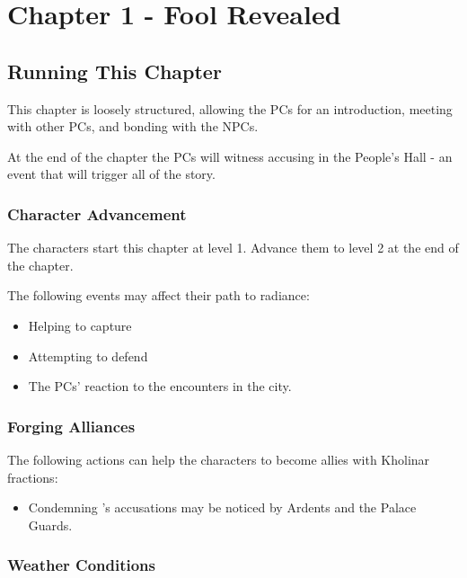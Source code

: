\chapter{Chapter 1 - Fool Revealed}
\label{chap:chapter1}

\setcounter{section}{-1}
\section{Running This Chapter}

This chapter is loosely structured, allowing the PCs for an introduction, meeting with other PCs, and bonding with the NPCs.

At the end of the chapter the PCs will witness \npcRebelArdent{} accusing \npcQueen{} in the People's Hall - an event that will trigger all of the story.

\subsection{Character Advancement}

The characters start this chapter at level 1. Advance them to level 2 at the end of the chapter.

The following events may affect their path to radiance:
\begin{itemize}
	\item Helping to capture \npcRebelArdent{}
	\item Attempting to defend \npcRebelArdent{}
	\item The PCs' reaction to the encounters in the city.
\end{itemize}


\subsection{Forging Alliances}

The following actions can help the characters to become allies with Kholinar fractions:
\begin{itemize}
	\item Condemning \npcRebelArdent{}'s accusations may be noticed by Ardents and the Palace Guards.
\end{itemize}



\subsection{Weather Conditions}

